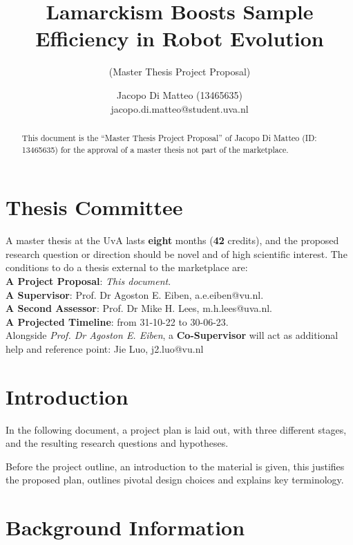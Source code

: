 \documentclass{scrartcl}
\title{Lamarckism Boosts Sample Efficiency in Robot Evolution}
\subtitle{(Master Thesis Project Proposal)}
\author{Jacopo Di Matteo \small{(13465635)} \\ \small{jacopo.di.matteo@student.uva.nl}}
\begin{document}
\maketitle

\begin{abstract}
This document is the ``Master Thesis Project Proposal'' of Jacopo Di Matteo (ID: 13465635) for the approval of a master thesis not part of the marketplace.
\end{abstract}

\section{Thesis Committee}
A master thesis at the UvA lasts \textbf{eight} months (\textbf{42} credits), and the proposed research question or direction should be novel and of high scientific interest.
The conditions to do a thesis external to the marketplace are: \\

\textbf{A Project Proposal}: 
\textit{This document}. \\

\textbf{A Supervisor}: 
Prof. Dr Agoston E. Eiben, 
a.e.eiben@vu.nl. \\

\textbf{A Second Assessor}: 
Prof. Dr Mike H. Lees,
m.h.lees@uva.nl. \\

\textbf{A Projected Timeline}: 
from 31-10-22
to 30-06-23.
\\

Alongside \textit{Prof. Dr Agoston E. Eiben}, a \textbf{Co-Supervisor} will act as additional help and reference point:
Jie Luo, 
j2.luo@vu.nl \\

\section{Introduction}
In the following document, a project plan is laid out, with three different stages, and the resulting research questions and hypotheses.

Before the project outline, an introduction to the material is given, this justifies the proposed plan, outlines pivotal design choices and explains key terminology.

\section{Background Information}
\end{document}
